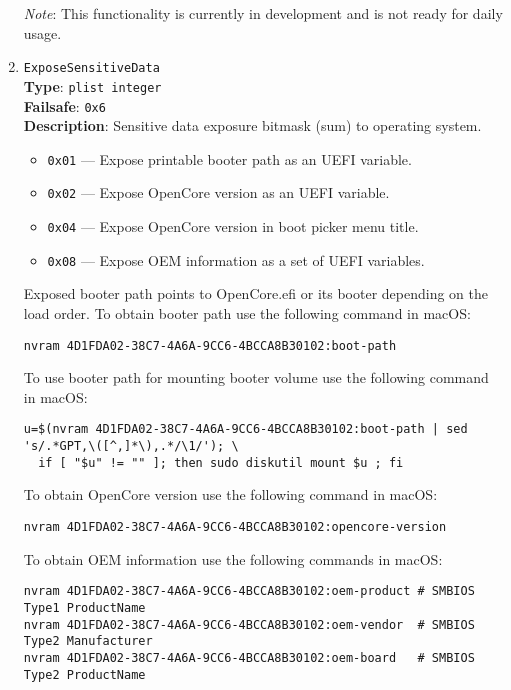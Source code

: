 \documentclass[]{article}
\providecommand{\tightlist}{%
  \setlength{\itemsep}{0pt}\setlength{\parskip}{0pt}}
\begin{document}
\begin{enumerate}
  \emph{Note}: This functionality is currently in development and is not ready for
  daily usage.

\item
  \texttt{ExposeSensitiveData}\\
  \textbf{Type}: \texttt{plist\ integer}\\
  \textbf{Failsafe}: \texttt{0x6}\\
  \textbf{Description}: Sensitive data exposure bitmask (sum) to operating system.

  \begin{itemize}
  \tightlist
    \item \texttt{0x01} --- Expose printable booter path as an UEFI variable.
    \item \texttt{0x02} --- Expose OpenCore version as an UEFI variable.
    \item \texttt{0x04} --- Expose OpenCore version in boot picker menu title.
    \item \texttt{0x08} --- Expose OEM information as a set of UEFI variables.
  \end{itemize}

  Exposed booter path points to OpenCore.efi or its booter depending on the load order.
  To obtain booter path use the following command in macOS:
\begin{lstlisting}[label=nvrampath, style=ocbash]
nvram 4D1FDA02-38C7-4A6A-9CC6-4BCCA8B30102:boot-path
\end{lstlisting}

  To use booter path for mounting booter volume use the following command in macOS:
\begin{lstlisting}[label=nvrampathmount, style=ocbash]
u=$(nvram 4D1FDA02-38C7-4A6A-9CC6-4BCCA8B30102:boot-path | sed 's/.*GPT,\([^,]*\),.*/\1/'); \
  if [ "$u" != "" ]; then sudo diskutil mount $u ; fi
\end{lstlisting}

  To obtain OpenCore version use the following command in macOS:
\begin{lstlisting}[label=nvramver, style=ocbash]
nvram 4D1FDA02-38C7-4A6A-9CC6-4BCCA8B30102:opencore-version
\end{lstlisting}

  To obtain OEM information use the following commands in macOS:
\begin{lstlisting}[label=nvramoem, style=ocbash]
nvram 4D1FDA02-38C7-4A6A-9CC6-4BCCA8B30102:oem-product # SMBIOS Type1 ProductName
nvram 4D1FDA02-38C7-4A6A-9CC6-4BCCA8B30102:oem-vendor  # SMBIOS Type2 Manufacturer
nvram 4D1FDA02-38C7-4A6A-9CC6-4BCCA8B30102:oem-board   # SMBIOS Type2 ProductName
\end{lstlisting}


\end{enumerate}
\end{document}
